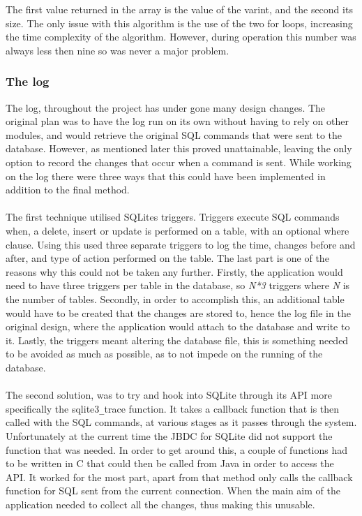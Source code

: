 The first value returned in the array is the value of the varint, and the second its size. The only issue with this algorithm is the use of the two for loops, increasing the time complexity of the algorithm. However, during operation this number was always less then nine so was never a major problem.

\subsubsection{The log}
\label{subsubsec:log_imp}

The log, throughout the project has under gone many design changes. The original plan was to have the log run on its own without having to rely on other modules, and would retrieve the original SQL commands that were sent to the database. However, as mentioned later this proved unattainable, leaving the only option to record the changes that occur when a command is sent. While working on the log there were three ways that this could have been implemented in addition to the final method.
\\\\
The first technique utilised SQLites triggers. Triggers execute SQL commands when, a delete, insert or update is performed on a table, with an optional where clause. Using this \cite{sqlitetriggers} used three separate triggers to log the time, changes before and after, and type of action performed on the table. The last part is one of the reasons why this could not be taken any further. Firstly, the application would need to have three triggers per table in the database, so \textit{N*3} triggers where \textit{N} is the number of tables. Secondly, in order to accomplish this, an additional table would have to be created that the changes are stored to, hence the log file in the original design, where the application would attach to the database and write to it. Lastly, the triggers meant altering the database file, this is something needed to be avoided as much as possible, as to not impede on the running of the database.  
\\\\
The second solution, was to try and hook into SQLite through its API more specifically the sqlite3\verb|_|trace function. It takes a callback function that is then called with the SQL commands, at various stages as it passes through the system. Unfortunately at the current time the JBDC for SQLite did not support the function that was needed. In order to get around this, a couple of functions had to be written in C that could then be called from Java in order to access the API. It worked for the most part, apart from that method only calls the callback function for SQL sent from the current connection. When the main aim of the application needed to collect all the changes, thus making this unusable. 
